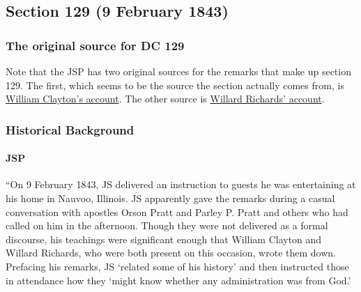 \subsection{Section 129 (9 February 1843)}
	\label{DC129}
	
	\subsubsection{The original source for DC 129}
	
		Note that the JSP has two original sources for the remarks that make up section 129. The first, which seems to be the source the section actually comes from, is \hyperref[EMS-1843-JS-9-FEB-1843-WC]{William Clayton's account}. The other source is \hyperref[EMS-1843-JS-9-FEB-1843-WR]{Willard Richards' account}.
	
	\subsubsection{Historical Background}
		\label{DC129-HB}
		
		\paragraph{JSP}
		
			``On 9 February 1843, JS delivered an instruction to guests he was entertaining at his home in Nauvoo, Illinois. JS apparently gave the remarks during a casual conversation with apostles Orson Pratt and Parley P. Pratt and others who had called on him in the afternoon. Though they were not delivered as a formal discourse, his teachings were significant enough that William Clayton and Willard Richards, who were both present on this occasion, wrote them down. Prefacing his remarks, JS `related some of his history' and then instructed those in attendance how they `might know whether any administration was from God.'

